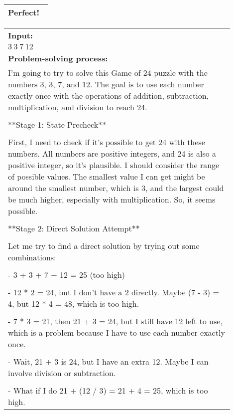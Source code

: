 \begin{table*}[ht]
\begin{tabular}{p{0.9\linewidth}}
Perfect!
\\ \bottomrule
\end{tabular}
\label{tab:qwq_LRM_game24}
\end{table*}


\begin{table*}[ht]
\small
\centering
\caption{An example of the problem-solving process of using \textsc{Self-Search (Low)} QwQ-32B-Preview for the Game of 24 task.}
\begin{tabular}{p{0.9\linewidth}} \toprule
\textbf{Input: }\\
$3\ 3\ 7\ 12$\\
\midrule
\textbf{Problem-solving process:}\\
I'm going to try to solve this Game of 24 puzzle with the numbers 3, 3, 7, and 12. The goal is to use each number exactly once with the operations of addition, subtraction, multiplication, and division to reach 24.\\
\\
**Stage 1: State Precheck**\\
\\
First, I need to check if it's possible to get 24 with these numbers. All numbers are positive integers, and 24 is also a positive integer, so it's plausible. I should consider the range of possible values. The smallest value I can get might be around the smallest number, which is 3, and the largest could be much higher, especially with multiplication. So, it seems possible.\\
\\
**Stage 2: Direct Solution Attempt**\\
\\
Let me try to find a direct solution by trying out some combinations:\\
\\
- 3 + 3 + 7 + 12 = 25 (too high)\\
\\
- 12 * 2 = 24, but I don't have a 2 directly. Maybe (7 - 3) = 4, but 12 * 4 = 48, which is too high.\\
\\
- 7 * 3 = 21, then 21 + 3 = 24, but I still have 12 left to use, which is a problem because I have to use each number exactly once.\\
\\
- Wait, 21 + 3 is 24, but I have an extra 12. Maybe I can involve division or subtraction.\\
\\
- What if I do 21 + (12 / 3) = 21 + 4 = 25, which is too high.\\

\end{tabular}
\end{table*}
